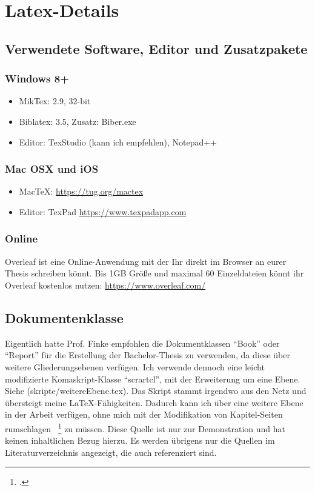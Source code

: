 \newpage

\section{Latex-Details}

\subsection{Verwendete Software, Editor und Zusatzpakete}
\subsubsection{Windows 8+}
\begin{itemize}
\item MikTex: 2.9, 32-bit
\item Biblatex: 3.5, Zusatz: Biber.exe
\item Editor: TexStudio (kann ich empfehlen), Notepad++
\end{itemize}

\subsubsection{Mac OSX und iOS}
\begin{itemize}
\item MacTeX: \url{https://tug.org/mactex}
\item Editor: TexPad \url{https://www.texpadapp.com}
\end{itemize}



\subsubsection{Online}
Overleaf ist eine Online-Anwendung mit der Ihr direkt im Browser an eurer Thesis schreiben könnt. Bis 1GB Größe und
maximal 60 Einzeldateien könnt ihr Overleaf kostenlos nutzen: \url{https://www.overleaf.com/}


\subsection{Dokumentenklasse}
Eigentlich hatte Prof. Finke empfohlen die Dokumentklassen \enquote{Book} oder \enquote{Report} für die Erstellung der
Bachelor-Thesis zu verwenden, da diese über weitere Gliederungsebenen verfügen. Ich verwende dennoch eine leicht
modifizierte Komaskript-Klasse \enquote{scrartcl}, mit der Erweiterung um eine Ebene. Siehe (skripte/weitereEbene.tex).
Das Skript stammt irgendwo aus den Netz und übersteigt meine \LaTeX{}-Fähigkeiten. Dadurch kann ich über eine weitere
Ebene in der Arbeit verfügen, ohne mich mit der Modifikation von Kapitel-Seiten rumschlagen~
\footcite[Vgl. ][Seite 5]{Tanenbaum.2003} zu müssen. Diese Quelle ist nur zur Demonstration und hat keinen inhaltlichen
Bezug hierzu. Es werden übrigens nur die Quellen im Literaturverzeichnis angezeigt, die auch referenziert sind.


